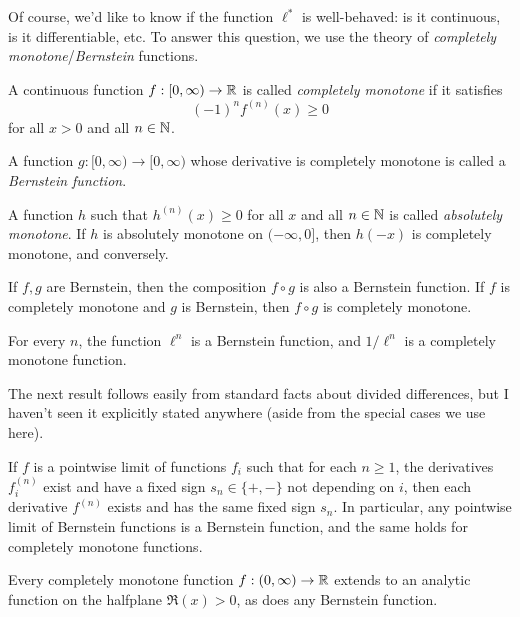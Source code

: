 \documentclass[letterpaper,11pt]{article}
\begin{document}
Of course, we'd like to know if the function $\ell^*$ is well-behaved: is it continuous, is it differentiable, etc. To answer this question, we use the theory of \emph{completely monotone}/\emph{Bernstein} functions.

\begin{defn} A continuous function $f : [0,\infty) \rightarrow \mathbb{R}$ is called \emph{completely monotone} if it satisfies
\[
(-1)^nf^{(n)}(x) \ge 0
\]
for all $x > 0$ and all $n \in \mathbb{N}$.

A function $g : [0,\infty) \rightarrow [0,\infty)$ whose derivative is completely monotone is called a \emph{Bernstein function}.

A function $h$ such that $h^{(n)}(x) \ge 0$ for all $x$ and all $n \in \mathbb{N}$ is called \emph{absolutely monotone}. If $h$ is absolutely monotone on $(-\infty, 0]$, then $h(-x)$ is completely monotone, and conversely.
\end{defn}

\begin{prop} If $f,g$ are Bernstein, then the composition $f \circ g$ is also a Bernstein function. If $f$ is completely monotone and $g$ is Bernstein, then $f \circ g$ is completely monotone.
\end{prop}

\begin{cor} For every $n$, the function $\ell^n$ is a Bernstein function, and $1/\ell^n$ is a completely monotone function.
\end{cor}

The next result follows easily from standard facts about divided differences, but I haven't seen it explicitly stated anywhere (aside from the special cases we use here).

\begin{prop} If $f$ is a pointwise limit of functions $f_i$ such that for each $n \ge 1$, the derivatives $f_i^{(n)}$ exist and have a fixed sign $s_n \in \{+,-\}$ not depending on $i$, then each derivative $f^{(n)}$ exists and has the same fixed sign $s_n$. In particular, any pointwise limit of Bernstein functions is a Bernstein function, and the same holds for completely monotone functions.
\end{prop}

\begin{prop} Every completely monotone function $f : (0,\infty) \rightarrow \mathbb{R}$ extends to an analytic function on the halfplane $\Re(x) > 0$, as does any Bernstein function.
\end{prop}
\end{document}

